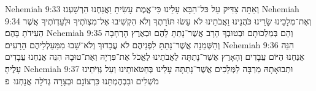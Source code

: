 Nehemiah 9:33	וְאַתָּה צַדִּיק עַל כּל־הַבָּא עָלֵינוּ כִּי־אֱמֶת עָשִׂיתָ וַאֲנַחְנוּ הִרְשָׁעְנוּ׃
Nehemiah 9:34	וְאֶת־מְלָכֵינוּ שָׂרֵינוּ כֹּהֲנֵינוּ וַאֲבֹתֵינוּ לֹא עָשׂוּ תּוֹרָתֶךָ וְלֹא הִקְשִׁיבוּ אֶל־מִצְוֺתֶיךָ וּלְעֵדְוֺתֶיךָ אֲשֶׁר הַעִידֹתָ בָּהֶם׃
Nehemiah 9:35	וְהֵם בְּמַלְכוּתָם וּבְטוּבְךָ הָרָב אֲשֶׁר־נָתַתָּ לָהֶם וּבְאֶרֶץ הָרְחָבָה וְהַשְּׁמֵנָה אֲשֶׁר־נָתַתָּ לִפְנֵיהֶם לֹא עֲבָדוּךָ וְלֹא־שָׁבוּ מִמַּעַלְלֵיהֶם הָרָעִים׃
Nehemiah 9:36	הִנֵּה אֲנַחְנוּ הַיּוֹם עֲבָדִים וְהָאָרֶץ אֲשֶׁר־נָתַתָּה לַאֲבֹתֵינוּ לֶאֱכֹל אֶת־פִּרְיָהּ וְאֶת־טוּבָהּ הִנֵּה אֲנַחְנוּ עֲבָדִים עָלֶיהָ׃
Nehemiah 9:37	וּתְבוּאָתָהּ מַרְבָּה לַמְּלָכִים אֲשֶׁר־נָתַתָּה עָלֵינוּ בְּחַטֹּאותֵינוּ וְעַל גְּוִיֹּתֵינוּ מֹשְׁלִים וּבִבְהֶמְתֵּנוּ כִּרְצוֹנָם וּבְצָרָה גְדֹלָה אֲנָחְנוּ׃ {פ}
